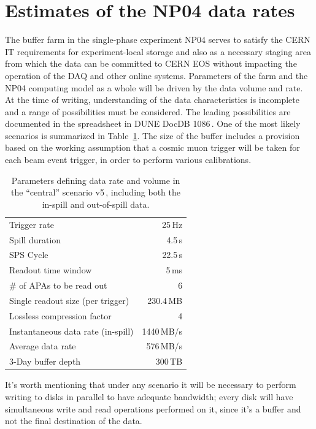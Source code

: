 \documentclass[12pt]{article}
\begin{document}
\section{Estimates of the NP04 data rates}
\label{sec:np04_data_rate}
The buffer farm in the single-phase experiment NP04 serves to satisfy
the CERN IT requirements for experiment-local storage and also as a necessary
staging area from which the data can be committed to CERN EOS without impacting the operation
of the DAQ and other online systems. Parameters of the farm and the NP04 computing model
as a whole will be driven by the data volume and rate. At the time of writing, understanding of the data
characteristics is incomplete and a range of possibilities must be considered. The leading
possibilities are documented in the spreadsheet in DUNE DocDB 1086\,\cite{duneDocDb1086}.
One of the most likely scenarios is summarized in Table~\ref{tab:np04_data_rate}. The size of
the buffer includes a provision based on the working assumption that a cosmic muon trigger will
be taken for each beam event trigger, in order to perform various calibrations.

\begin{table}[htbp]
  \centering
  \begin{tabular}[h]{l|r}
\hline
    Trigger rate & 25\,Hz \\
    Spill duration & 4.5\,s\\
    SPS Cycle & 22.5\,s \\
    Readout time window & 5\,ms \\
    \# of APAs to be read out & 6 \\
    \hline
    Single readout size (per trigger) & 230.4\,MB \\
    Lossless compression factor & 4 \\
    Instantaneous data rate (in-spill) & 1440\,MB/s \\
    Average data rate & 576\,MB/s \\
    \hline
    3-Day buffer depth & 300\,TB \\
    \hline
  \end{tabular}
  \caption{Parameters defining data rate and volume in the ``central'' scenario v5\,\cite{duneDocDb1086}, including both
  the in-spill and out-of-spill data.}
  \label{tab:np04_data_rate}
\end{table}

\noindent It's worth mentioning that under any scenario it will be necessary to perform writing to disks in parallel
to have adequate bandwidth; every disk will have simultaneous write and read operations performed on it, since
it's a buffer and not the final destination of the data.
\end{document}
